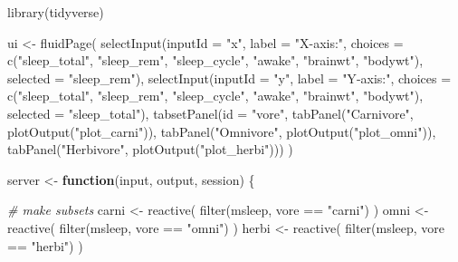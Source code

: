 \documentclass[
]{book}
\newenvironment{Shaded}{\begin{snugshade}}{\end{snugshade}}
\newcommand{\AttributeTok}[1]{\textcolor[rgb]{0.77,0.63,0.00}{#1}}
\newcommand{\CommentTok}[1]{\textcolor[rgb]{0.56,0.35,0.01}{\textit{#1}}}
\newcommand{\ControlFlowTok}[1]{\textcolor[rgb]{0.13,0.29,0.53}{\textbf{#1}}}
\newcommand{\FunctionTok}[1]{\textcolor[rgb]{0.00,0.00,0.00}{#1}}
\newcommand{\NormalTok}[1]{#1}
\newcommand{\OtherTok}[1]{\textcolor[rgb]{0.56,0.35,0.01}{#1}}
\newcommand{\SpecialCharTok}[1]{\textcolor[rgb]{0.00,0.00,0.00}{#1}}
\newcommand{\StringTok}[1]{\textcolor[rgb]{0.31,0.60,0.02}{#1}}
\theoremstyle{definition}
\theoremstyle{definition}
\theoremstyle{definition}
\theoremstyle{definition}
\theoremstyle{remark}
\begin{document}
\begin{Shaded}
\begin{Highlighting}[]
\FunctionTok{library}\NormalTok{(tidyverse)}

\NormalTok{ui }\OtherTok{\textless{}{-}} \FunctionTok{fluidPage}\NormalTok{(}
  \FunctionTok{selectInput}\NormalTok{(}\AttributeTok{inputId =} \StringTok{"x"}\NormalTok{,}
              \AttributeTok{label =} \StringTok{"X{-}axis:"}\NormalTok{,}
              \AttributeTok{choices =} \FunctionTok{c}\NormalTok{(}\StringTok{"sleep\_total"}\NormalTok{, }\StringTok{"sleep\_rem"}\NormalTok{, }\StringTok{"sleep\_cycle"}\NormalTok{, }
                          \StringTok{"awake"}\NormalTok{, }\StringTok{"brainwt"}\NormalTok{, }\StringTok{"bodywt"}\NormalTok{),}
              \AttributeTok{selected =} \StringTok{"sleep\_rem"}\NormalTok{),}
  \FunctionTok{selectInput}\NormalTok{(}\AttributeTok{inputId =} \StringTok{"y"}\NormalTok{,}
              \AttributeTok{label =} \StringTok{"Y{-}axis:"}\NormalTok{,}
              \AttributeTok{choices =} \FunctionTok{c}\NormalTok{(}\StringTok{"sleep\_total"}\NormalTok{, }\StringTok{"sleep\_rem"}\NormalTok{, }\StringTok{"sleep\_cycle"}\NormalTok{, }
                          \StringTok{"awake"}\NormalTok{, }\StringTok{"brainwt"}\NormalTok{, }\StringTok{"bodywt"}\NormalTok{),}
              \AttributeTok{selected =} \StringTok{"sleep\_total"}\NormalTok{),}
  \FunctionTok{tabsetPanel}\NormalTok{(}\AttributeTok{id =} \StringTok{"vore"}\NormalTok{,}
              \FunctionTok{tabPanel}\NormalTok{(}\StringTok{"Carnivore"}\NormalTok{,}
                       \FunctionTok{plotOutput}\NormalTok{(}\StringTok{"plot\_carni"}\NormalTok{)),}
              \FunctionTok{tabPanel}\NormalTok{(}\StringTok{"Omnivore"}\NormalTok{,}
                       \FunctionTok{plotOutput}\NormalTok{(}\StringTok{"plot\_omni"}\NormalTok{)),}
              \FunctionTok{tabPanel}\NormalTok{(}\StringTok{"Herbivore"}\NormalTok{,}
                       \FunctionTok{plotOutput}\NormalTok{(}\StringTok{"plot\_herbi"}\NormalTok{)))}
\NormalTok{)}

\NormalTok{server }\OtherTok{\textless{}{-}} \ControlFlowTok{function}\NormalTok{(input, output, session) \{}

  \CommentTok{\# make subsets}
\NormalTok{  carni }\OtherTok{\textless{}{-}} \FunctionTok{reactive}\NormalTok{( }\FunctionTok{filter}\NormalTok{(msleep, vore }\SpecialCharTok{==} \StringTok{"carni"}\NormalTok{) )}
\NormalTok{  omni  }\OtherTok{\textless{}{-}} \FunctionTok{reactive}\NormalTok{( }\FunctionTok{filter}\NormalTok{(msleep, vore }\SpecialCharTok{==} \StringTok{"omni"}\NormalTok{)  )}
\NormalTok{  herbi }\OtherTok{\textless{}{-}} \FunctionTok{reactive}\NormalTok{( }\FunctionTok{filter}\NormalTok{(msleep, vore }\SpecialCharTok{==} \StringTok{"herbi"}\NormalTok{) )}


\end{Highlighting}
\end{Shaded}
\end{document}
